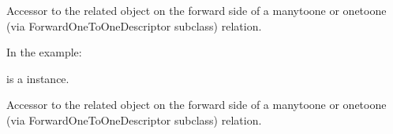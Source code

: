 \documentclass[a4paper,11pt,spanish]{sphinxmanual}
\begin{document}
\begin{fulllineitems}
\begin{fulllineitems}
\end{fulllineitems}


\begin{fulllineitems}
\label{\detokenize{api/inventory/inventory.models:inventory.models.LotStock.location}}
\pysigstartsignatures
\pysigline
{}
\pysigstopsignatures
\sphinxAtStartPar
Accessor to the related object on the forward side of a many\sphinxhyphen{}to\sphinxhyphen{}one or
one\sphinxhyphen{}to\sphinxhyphen{}one (via ForwardOneToOneDescriptor subclass) relation.

\sphinxAtStartPar
In the example:

\begin{sphinxVerbatim}[commandchars=\\\{\}]
       
\end{sphinxVerbatim}

\sphinxAtStartPar
{} is a  instance.

\end{fulllineitems}


\begin{fulllineitems}
\label{\detokenize{api/inventory/inventory.models:inventory.models.LotStock.location_id}}
\pysigstartsignatures
\pysigline
{}
\pysigstopsignatures
\end{fulllineitems}


\begin{fulllineitems}
\label{\detokenize{api/inventory/inventory.models:inventory.models.LotStock.lot}}
\pysigstartsignatures
\pysigline
{}
\pysigstopsignatures
\sphinxAtStartPar
Accessor to the related object on the forward side of a many\sphinxhyphen{}to\sphinxhyphen{}one or
one\sphinxhyphen{}to\sphinxhyphen{}one (via ForwardOneToOneDescriptor subclass) relation.


\end{fulllineitems}
\end{fulllineitems}
\end{document}
